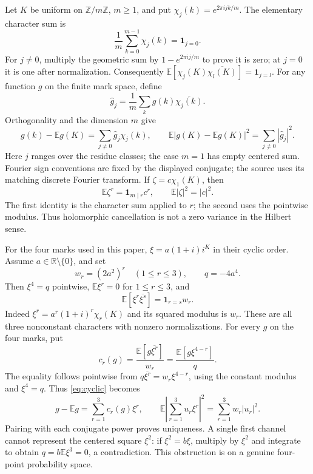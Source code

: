 \documentclass[11pt]{article}
\newcommand{\E}{\mathbb E}\newcommand{\Pp}{\mathbb P}
\begin{document}
Let $K$ be uniform on $\mathbb Z/m\mathbb Z$, $m\ge1$, and put
$\chi_j(k)=e^{2\pi i jk/m}$. The elementary character sum is
\[
 \frac1m\sum_{k=0}^{m-1}\chi_j(k)=\mathbf1_{j=0}.
\]
For $j\ne0$, multiply the geometric sum by $1-e^{2\pi i j/m}$ to
prove it is zero; at $j=0$ it is one after normalization. Consequently
$\E[\chi_j(K)\overline{\chi_l(K)}]=\mathbf1_{j=l}$.
For any function $g$ on the finite mark space, define
\[
 \widehat g_j=\frac1m\sum_k g(k)\overline{\chi_j(k)}.
\]
Orthogonality and the dimension $m$ give
\begin{equation}\label{eq:cyclic}
 g(k)-\E g(K)=\sum_{j\ne0}\widehat g_j\chi_j(k),\qquad
 \E|g(K)-\E g(K)|^2=\sum_{j\ne0}|\widehat g_j|^2.
\end{equation}
Here $j$ ranges over the residue classes; the case $m=1$ has empty
centered sum. Fourier sign conventions are fixed by the displayed
conjugate; the source uses its matching discrete Fourier transform.
If $\zeta=c\chi_1(K)$, then
\[
 \E\zeta^r=\mathbf1_{m\mid r}c^r,\qquad
 \E|\zeta|^2=|c|^2.
\]
The first identity is the character sum applied to $r$; the second
uses the pointwise modulus. Thus holomorphic cancellation is not a
zero variance in the Hilbert sense.

For the four marks used in this paper, $\xi=a(1+i)i^K$ in their cyclic
order. Assume $a\in\mathbb R\setminus\{0\}$, and set
\[
 w_r=(2a^2)^r\quad(1\le r\le3),\qquad q=-4a^4.
\]
Then $\xi^4=q$ pointwise, $\E\xi^r=0$ for $1\le r\le3$, and
\begin{equation}\label{eq:rootgram}
 \E[\xi^r\overline{\xi^s}]=\mathbf1_{r=s}w_r.
\end{equation}
Indeed $\xi^r=a^r(1+i)^r\chi_r(K)$ and its squared modulus is $w_r$.
These are all three nonconstant characters with nonzero normalizations.
For every $g$ on the four marks, put
\begin{equation}\label{eq:rootcoefficient}
 c_r(g)=\frac{\E[g\overline{\xi^r}]}{w_r}
       =\frac{\E[g\xi^{4-r}]}q.
\end{equation}
The equality follows pointwise from
$q\overline{\xi^r}=w_r\xi^{4-r}$, using the constant modulus and
$\xi^4=q$. Thus \eqref{eq:cyclic} becomes
\begin{equation}\label{eq:rootrepresent}
 g-\E g=\sum_{r=1}^3c_r(g)\xi^r,\qquad
 \E\left|\sum_{r=1}^3u_r\xi^r\right|^2
   =\sum_{r=1}^3w_r|u_r|^2.
\end{equation}
Pairing with each conjugate power proves uniqueness. A single first
channel cannot represent the centered square $\xi^2$: if
$\xi^2=b\xi$, multiply by $\xi^2$ and integrate to obtain
$q=b\E\xi^3=0$, a contradiction. This obstruction is on a genuine
four-point probability space.
\end{document}
